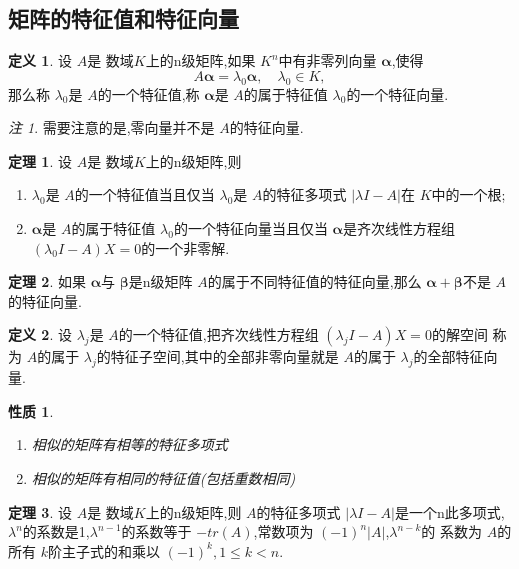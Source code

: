\documentclass[a4paper,11pt]{article}%
\theoremstyle{remark}
\newtheorem*{remark}{注}
\theoremstyle{definition}
\newtheorem{theorem}{定理}[section]
\theoremstyle{definition}
\newtheorem*{definition}{定义}
\theoremstyle{plain}
\newtheorem*{property}{性质}
\newcommand*{\abs}[1]{\lvert #1 \rvert}
\begin{document}
\subsection{矩阵的特征值和特征向量}
\begin{definition}
    设 $A$是 数域$K$上的n级矩阵,如果 $K^n$中有非零列向量 $\bm{\alpha}$,使得
    \[A \bm{\alpha}=\lambda_0 \bm{\alpha},\phantom{11}\lambda_0\in K,\]
    那么称 $\lambda_0$是 $A$的一个特征值,称 $\bm{\alpha}$是 $A$的属于特征值 $\lambda_0$的一个特征向量.
\end{definition}
\begin{remark}
    需要注意的是,零向量并不是 $A$的特征向量. 
\end{remark}
\begin{theorem}
    设 $A$是 数域$K$上的n级矩阵,则
    \begin{enumerate}
        \item $\lambda_0$是 $A$的一个特征值当且仅当 $\lambda_0$是 $A$的特征多项式 $\abs{\lambda I-A}$在 $K$中的一个根;
        \item $\bm{\alpha}$是 $A$的属于特征值 $\lambda_0$的一个特征向量当且仅当 $\bm{\alpha}$是齐次线性方程组 $(\lambda_0 I-A)X=0$的一个非零解.
    \end{enumerate}
\end{theorem}
\begin{theorem}
    如果 $\bm{\alpha}$与 $\bm{\beta}$是n级矩阵 $A$的属于不同特征值的特征向量,那么 $\bm{\alpha}+\bm{\beta}$不是 $A$的特征向量.
\end{theorem}
\begin{definition}
    设 $\lambda_j$是 $A$的一个特征值,把齐次线性方程组 $(\lambda_jI-A)X=0$的解空间
    称为 $A$的属于 $\lambda_j$的特征子空间,其中的全部非零向量就是 $A$的属于 $\lambda_j$的全部特征向量.
\end{definition}
\begin{property}
    \begin{enumerate}
        \item 相似的矩阵有相等的特征多项式
        \item 相似的矩阵有相同的特征值(包括重数相同)
    \end{enumerate}
\end{property}
\begin{theorem}
    设 $A$是 数域$K$上的n级矩阵,则 $A$的特征多项式 $\abs{\lambda I-A}$是一个n此多项式,
    $\lambda^n$的系数是1,$\lambda^{n-1}$的系数等于 $-tr(A)$,常数项为 $(-1)^n\abs{A}$,$\lambda^{n-k}$的
    系数为 $A$的所有 $k$阶主子式的和乘以 $(-1)^k,1\leq k<n.$
\end{theorem}
\end{document}
